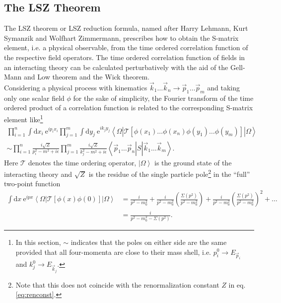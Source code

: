 \subsection{The LSZ Theorem}\label{sec:LSZ}
The LSZ theorem\cite{Lehmann:1954rq} or LSZ reduction formula, named after  Harry Lehmann, Kurt Symanzik and Wolfhart Zimmermann, prescribes how to obtain the S-matrix element, i.e. a physical observable, from the time ordered correlation function of the respective field operators. The time ordered correlation function of fields in an interacting theory can be calculated perturbatively with the aid of the Gell-Mann and Low theorem and the Wick theorem. \\
Considering a physical process with kinematics $\vec{k}_1 \hdots \vec{k}_n \to \vec{p}_1 \hdots \vec{p}_m$ and taking only one scalar field $\phi$ for the sake of simplicity, the Fourier transform of the time ordered product of a correlation function is related to the corresponding S-matrix element like\footnote{In this section, $\sim$ indicates that the poles on either side are the same provided that all four-momenta are close to their mass shell, i.e. $p_i^0 \to E_{\vec{p}_i}$ and $k_j^0 \to E_{\vec{k}_j}$.}
\begin{align}
\prod_{i=1}^n \int \mathrm{d}x_i\ \mathrm{e}^{ip_i x_i} \prod_{j=1}^m \int \mathrm{d}y_j\ \mathrm{e}^{ik_j y_j} \left\langle \Omega | \mathcal{T} \left[ \phi(x_1) \hdots \phi(x_n) \phi(y_1) \hdots \phi(y_m) \right] | \Omega\right\rangle \nonumber\\
\sim \prod_{i=1}^n \frac{i\sqrt{Z}}{p_i^2 - m^2 + i\epsilon} \prod_{j=1}^m \frac{i\sqrt{Z}}{k_j^2 - m^2 + i\epsilon} \left\langle \vec{p}_1 \hdots \vec{p}_n \left| S \left| \vec{k}_1 \hdots \vec{k}_m \right\rangle\right.\right. .\label{eq:LSZ}
\end{align}
Here $\mathcal{T}$ denotes the time ordering operator, $\left.| \Omega \right\rangle$ is the ground state of the interacting theory and $\sqrt{Z}$ is the residue of the single particle pole\footnote{Note that this does not coincide with the renormalization constant $Z$ in eq. \eqref{eq:renconst}.} in the ``full'' two-point function 
\begin{align}
\int \mathrm{d}x\ \mathrm{e}^{ip x} \left\langle \Omega | \mathcal{T} \left[ \phi(x) \phi(0) \right] | \Omega\right\rangle &= \frac{i}{p^2-m_0^2} + \frac{i}{p^2-m_0^2} \left(\frac{\Sigma(p^2)}{p^2-m_0^2}\right) + \frac{i}{p^2-m_0^2} \left(\frac{\Sigma(p^2)}{p^2-m_0^2}\right)^2 + \hdots\nonumber\\
&= \frac{i}{p^2 - m_0^2 - \Sigma(p^2)}.\label{eq:propagator}
\end{align}
